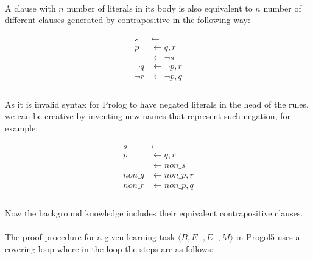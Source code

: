 \documentclass{article}
\theoremstyle{plain}
\theoremstyle{definition}
\begin{document}
\begin{multicols}{2}
\paragraph{} A clause with $n$ number of literals in its body is also equivalent to $n$ number of different clauses generated by contrapositive in the following way:

\begin{align*}
s &\leftarrow\\
p &\leftarrow q, r\\
&\leftarrow \lnot s\\
\lnot q &\leftarrow \lnot p, r\\
\lnot r &\leftarrow \lnot p, q\\
\end{align*}

\paragraph{} As it is invalid syntax for Prolog to have negated literals in the head of the rules, we can be creative by inventing new names that represent such negation, for example:

\begin{align*}
s &\leftarrow\\
p &\leftarrow q, r\\
&\leftarrow non\_s\\
non\_q &\leftarrow non\_p, r\\
non\_r &\leftarrow non\_p, q\\
\end{align*}

\paragraph{} Now the background knowledge includes their equivalent contrapositive clauses.

\paragraph{} The proof procedure for a given learning task $\langle B, E^+, E^-, M\rangle$ in Progol5 uses a covering loop where in the loop the steps are as follows:


\end{multicols}
\end{document}
